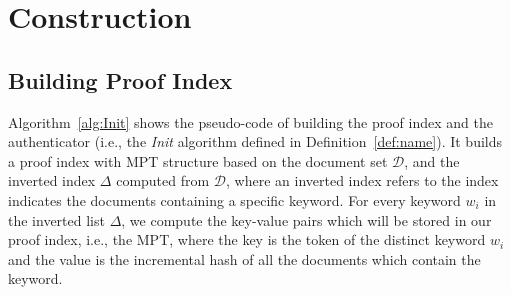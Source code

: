 \section{\name Construction}

\subsection{Building Proof Index}
Algorithm~\ref{alg:Init} shows the pseudo-code of building the proof index and the authenticator (i.e., the {\it Init} algorithm defined in Definition~\ref{def:name}).
It builds a proof index with MPT structure based on the document set $\mathcal{D}$, and the inverted index $\Delta$ computed from $\mathcal{D}$, where an inverted index refers to the index  indicates the documents containing a specific keyword.
For every keyword $w_i$ in the inverted list $\Delta$, we compute the key-value pairs which will be stored in our proof index, i.e., the MPT, where the key is the token of the distinct keyword $w_i$ and the value is the incremental hash of all the documents which contain the keyword. %
